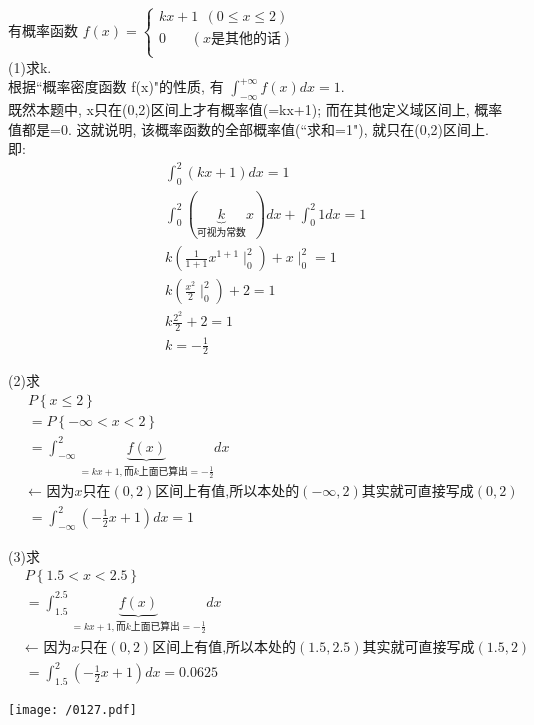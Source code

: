 \documentclass[UTF8]{ctexart}
\begin{document}
\begin{myEnvSample}
	有概率函数 $
	f\left( x \right) =\left\{ \begin{array}{l}
		kx+1\ \ \left( 0\leq x\leq 2 \right)\\
		0\ \ \ \ \ \ \ \ \left( x\text{是其他的话} \right)\\
	\end{array} \right. 
	$ \\
	
	(1)求k. \\
	根据``概率密度函数 f(x)"的性质, 有 $\int_{-\infty}^{+\infty}{f\left( x \right)} dx=1$. \\
	既然本题中, x只在(0,2)区间上才有概率值(=kx+1); 而在其他定义域区间上, 概率值都是=0. 这就说明, 该概率函数的全部概率值(``求和=1"), 就只在(0,2)区间上. \\
	
	即:
	\begin{align*}  %
		&\int_0^2{\left( kx+1 \right)}dx=1\\
		&\int_0^2{\left( \underset{\text{可视为常数}}{\underbrace{k}}x \right)}dx+\int_0^2{1}dx=1\\
		&k\left( \frac{1}{1+1}x^{1+1}\mid_{0}^{2} \right) +x\mid_{0}^{2}=1\\
		&k\left( \frac{x^2}{2}\mid_{0}^{2} \right) +2=1\\
		&k\frac{2^2}{2}+2=1\\
		&k=-\frac{1}{2}
	\end{align*} 
	
	
	
	(2)求
	\begin{align*}  %
		&P\left\{ x\leq 2 \right\}  \\
		&=P\left\{ -\infty <x<2 \right\}\\
		&	=\int_{-\infty}^2{\underset{=kx+1,\text{而}k\text{上面已算出}=-\frac{1}{2}}{\underbrace{f\left( x \right) }}}dx\\\
		&	\text{← 因为}x\text{只在}\left( 0,2 \right) \text{区间上有值,所以本处的}\left( -\infty ,2 \right) \text{其实就可直接写成}\left( 0,2 \right)\\
		&	=\int_{-\infty}^2{\left( -\frac{1}{2}x+1 \right)}dx=1
	\end{align*}
	
	
	
	(3)求 
	\begin{align*}  %
		&	P\left\{ 1.5<x<2.5 \right\} \\
		&=\int_{1.5}^{2.5}{\underset{=kx+1,\text{而}k\text{上面已算出}=-\frac{1}{2}}{\underbrace{f\left( x \right) }}}dx\\
		&	\text{← 因为}x\text{只在}\left( 0,2 \right) \text{区间上有值,所以本处的}\left( 1.5,2.5 \right) \text{其实就可直接写成}\left( 1.5,2 \right)\\
		&	=\int_{1.5}^2{\left( -\frac{1}{2}x+1 \right)}dx=0.0625
	\end{align*}
	
	\texttt{[image: /0127.pdf]}
	
	
\end{myEnvSample}
\end{document}
